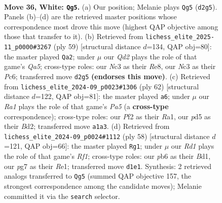 \documentclass[11pt]{article}
\begin{document}
\clearpage

\begin{figure}[p]\centering
\begin{subfigure}{0.46\textwidth}\centering
\resizebox{\linewidth}{!}{%
\newchessgame
\chessboard[
  setfen={2r3k1/3n2p1/1p3n2/r2p3p/Pq2p2N/2N3P1/2PQ1P1P/R2R1K2 w - - 6 36},
  showmover=false,
  pgfstyle=straightmove, color=movearrow, markmove={d2-g5}
]}
\caption{}
\end{subfigure}\hfill
\begin{subfigure}{0.46\textwidth}\centering
\resizebox{\linewidth}{!}{%
\newchessgame
\chessboard[
  setfen={r3r1k1/3Q2p1/2p2pp1/2Pp4/q2Pn3/4RN1P/5PP1/2R3K1 b - - 1 30},
  showmover=false,
  pgfstyle=straightmove, color=movearrow, markmove={a4-a2}
]}
\caption{}
\end{subfigure}
\\[4pt]
\begin{subfigure}{0.46\textwidth}\centering
\resizebox{\linewidth}{!}{%
\newchessgame
\chessboard[
  setfen={rr3nk1/2q3pp/2P1np2/Pp1Qp3/8/5NP1/3B1P1P/R1R3K1 w - - 3 32},
  showmover=false,
  pgfstyle=straightmove, color=movearrow, markmove={a5-a6}
]}
\caption{}
\end{subfigure}\hfill
\begin{subfigure}{0.46\textwidth}\centering
\resizebox{\linewidth}{!}{%
\newchessgame
\chessboard[
  setfen={2k2r2/pp1nq3/2pn1p2/6r1/3PPQPp/2P5/P2N4/3BRR1K w - - 4 30},
  showmover=false,
  pgfstyle=straightmove, color=movearrow, markmove={f1-g1}
]}
\caption{}
\end{subfigure}
\caption{\textbf{Move 36, White: \texttt{Qg5}.} (a) Our position; Melanie plays \texttt{Qg5} (\texttt{d2g5}). Panels (b)--(d) are the retrieved master positions whose correspondence most drove this move (highest QAP objective among those that transfer to it). (b) Retrieved from \texttt{lichess\_elite\_2025-11\_p0000\#3267} (ply 59) [structural distance $d$=134, QAP obj=80]: the master played \texttt{Qa2}; under $\mu$ our \emph{Qd2} plays the role of that game's \emph{Qa5}; cross-type roles: our \emph{N}c3 as their \emph{R}e8, our \emph{N}c3 as their \emph{P}c6; transferred move \texttt{d2g5} \textbf{(endorses this move)}. (c) Retrieved from \texttt{lichess\_elite\_2024-09\_p0023\#1306} (ply 62) [structural distance $d$=122, QAP obj=81]: the master played \texttt{a6}; under $\mu$ our \emph{Ra1} plays the role of that game's \emph{Pa5} (a \textbf{cross-type} correspondence); cross-type roles: our \emph{P}f2 as their \emph{R}a1, our \emph{p}d5 as their \emph{B}d2; transferred move \texttt{a1a3}. (d) Retrieved from \texttt{lichess\_elite\_2024-09\_p0024\#1112} (ply 58) [structural distance $d$=121, QAP obj=66]: the master played \texttt{Rg1}; under $\mu$ our \emph{Rd1} plays the role of that game's \emph{Rf1}; cross-type roles: our \emph{p}b6 as their \emph{B}d1, our \emph{p}g7 as their \emph{R}e1; transferred move \texttt{d1e1}. Synthesis: 2 retrieved analogs transferred to \texttt{Qg5} (summed QAP objective 157, the strongest correspondence among the candidate moves); Melanie committed it via the \texttt{search} selector.}
\label{fig:thought-m70}
\end{figure}
\end{document}
